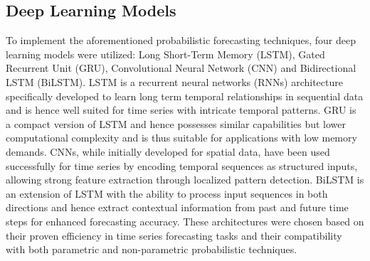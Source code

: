 \subsection{ Deep Learning Models}
To implement the aforementioned probabilistic forecasting techniques, four deep learning models were utilized: Long Short-Term Memory (LSTM), Gated Recurrent Unit (GRU), Convolutional Neural Network (CNN) and Bidirectional LSTM (BiLSTM). LSTM is a recurrent neural networks (RNNs) architecture specifically developed to learn long term temporal relationships in sequential data and is hence well suited for time series with intricate temporal patterns. GRU is a compact version of LSTM and hence possesses similar capabilities but lower computational complexity and is thus suitable for applications with low memory demands. CNNs, while initially developed for spatial data, have been used successfully for time series by encoding temporal sequences as structured inputs, allowing strong feature extraction through localized pattern detection. BiLSTM is an extension of LSTM with the ability to process input sequences in both directions and hence extract contextual information from past and future time steps for enhanced forecasting accuracy. These architectures were chosen based on their proven efficiency in time series forecasting tasks and their compatibility with both parametric and non-parametric probabilistic techniques.


